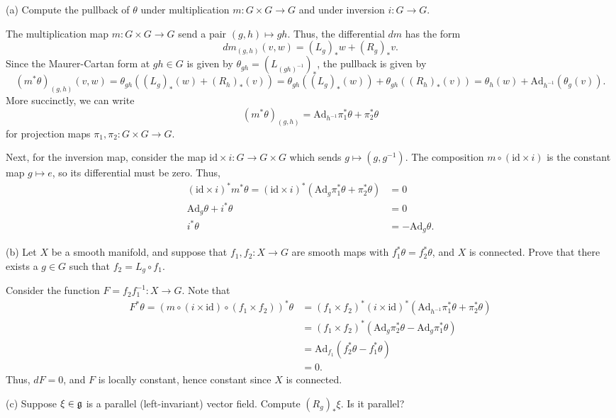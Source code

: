 \documentclass{../../templates/lkx_pset}
\begin{document}
\begin{parts}
	\begin{part}{(a)}
		Compute the pullback of $\theta$ under multiplication $m : G \times G \to G$ and under inversion $i : G \to G$.
	\end{part}

	The multiplication map $m : G\times G \to G$ send a pair $(g,h)\mapsto gh$. Thus, the differential $dm$ has the form
	\[
		dm_{(g,h)}(v,w) = (L_g)_* w + (R_g)_* v.
	\]
	Since the Maurer-Cartan form at $gh\in G$ is given by $\theta_{gh} = (L_{(gh)^{-1}})_*$, the pullback is given by
	\[
		(m^*\theta)_{(g,h)}(v,w) = \theta_{gh}((L_g)_* (w)+ (R_h)_* (v)) = \theta_{gh}((L_g)_* (w)) + \theta_{gh}((R_h)_* (v)) = \theta_h(w) + \textrm{Ad}_{h^{-1}}(\theta_g(v)).
	\]
	More succinctly, we can write
	\[
		{(m^*\theta)}_{(g,h)} = \textrm{Ad}_{h^{-1}} \pi_1^*\theta + \pi_2^*\theta
	\]
	for projection maps $\pi_1,\pi_2 : G\times G\to G$.

	Next, for the inversion map, consider the map $\textrm{id}\times i : G \to G\times G$ which sends $g\mapsto (g,g^{-1})$. The composition $m\circ (\textrm{id}\times i)$ is the constant map $g\mapsto e$, so its differential must be zero. Thus,
	\[
		\begin{aligned}
			(\textrm{id}\times i)^*m^* \theta
			= (\textrm{id}\times i)^*(\textrm{Ad}_{g}\pi_1^*\theta + \pi_2^*\theta)
			 & =0  \\
			\textrm{Ad}_{g}\theta + i^*\theta
			 & = 0 \\
			i^*\theta &= -\textrm{Ad}_{g}\theta.
		\end{aligned}
	\]

	\begin{part}{(b)}
	  Let $X$ be a smooth manifold, and suppose that $f_1, f_2: X \to G$ are smooth maps with $f_1^*\theta=f_2^*\theta$, and $X$ is connected. Prove that there exists a $g\in G$ such that $f_2 = L_g\circ f_1$.
	\end{part}

	Consider the function $F = f_2f_1^{-1} : X \to G$. Note that
	\[
    \begin{aligned}
      F^*\theta = (m\circ (i\times \textrm{id})\circ (f_1\times f_2))^*\theta
      &=(f_1\times f_2)^* (i\times \textrm{id})^* (\textrm{Ad}_{h^{-1}}\pi_1^*\theta + \pi_2^*\theta)\\
      &=(f_1\times f_2)^* (\textrm{Ad}_{g}\pi_2^*\theta - \textrm{Ad}_{g}\pi_1^*\theta)\\
      &=\textrm{Ad}_{f_1}(f_2^*\theta - f_1^*\theta)\\
      &=0.
    \end{aligned}
	\]
	Thus, $dF=0$, and $F$ is locally constant, hence constant since $X$ is connected.

	\begin{part}{(c)}
	  Suppose $\xi\in \mathfrak{g}$ is a parallel (left-invariant) vector field. Compute $(R_g)_* \xi$. Is it parallel?
	\end{part}
\end{parts}
\end{document}
